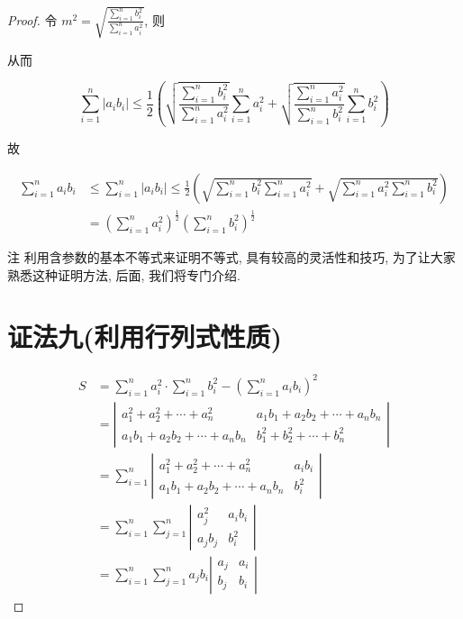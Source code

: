 \begin{proof}
	令 $m^{2}=\sqrt{\frac{\sum_{i=1}^{n} b_{i}^{2}}{\sum_{i=1}^{n} a_{i}^{2}}}$, 则
	
	
	从而
	
	$$
	\sum_{i=1}^{n}\left|a_{i} b_{i}\right| \leqslant \frac{1}{2}\left(\sqrt{\frac{\sum_{i=1}^{n} b_{i}^{2}}{\sum_{i=1}^{n} a_{i}^{2}}} \sum_{i=1}^{n} a_{i}^{2}+\sqrt{\frac{\sum_{i=1}^{n} a_{i}^{2}}{\sum_{i=1}^{n} b_{i}^{2}}} \sum_{i=1}^{n} b_{i}^{2}\right)
	$$
	
	故
	
	$$
	\begin{aligned}
	\sum_{i=1}^{n} a_{i} b_{i} & \leqslant \sum_{i=1}^{n}\left|a_{i} b_{i}\right| \leqslant \frac{1}{2}\left(\sqrt{\sum_{i=1}^{n} b_{i}^{2} \sum_{i=1}^{n} a_{i}^{2}}+\sqrt{\sum_{i=1}^{n} a_{i}^{2} \sum_{i=1}^{n} b_{i}^{2}}\right) \\
	& =\left(\sum_{i=1}^{n} a_{i}^{2}\right)^{\frac{1}{2}}\left(\sum_{i=1}^{n} b_{i}^{2}\right)^{\frac{1}{2}}
	\end{aligned}
	$$
	
	注 利用含参数的基本不等式来证明不等式, 具有较高的灵活性和技巧, 为了让大家熟悉这种证明方法, 后面, 我们将专门介绍.
	
	\section*{证法九(利用行列式性质)}
	$$
	\begin{aligned}
	S & =\sum_{i=1}^{n} a_{i}^{2} \cdot \sum_{i=1}^{n} b_{i}^{2}-\left(\sum_{i=1}^{n} a_{i} b_{i}\right)^{2} \\
	& =\left|\begin{array}{cc}
	a_{1}^{2}+a_{2}^{2}+\cdots+a_{n}^{2} & a_{1} b_{1}+a_{2} b_{2}+\cdots+a_{n} b_{n} \\
	a_{1} b_{1}+a_{2} b_{2}+\cdots+a_{n} b_{n} & b_{1}^{2}+b_{2}^{2}+\cdots+b_{n}^{2}
	\end{array}\right| \\
	& =\sum_{i=1}^{n}\left|\begin{array}{cc}
	a_{1}^{2}+a_{2}^{2}+\cdots+a_{n}^{2} & a_{i} b_{i} \\
	a_{1} b_{1}+a_{2} b_{2}+\cdots+a_{n} b_{n} & b_{i}^{2}
	\end{array}\right| \\
	& =\sum_{i=1}^{n} \sum_{j=1}^{n}\left|\begin{array}{cc}
	a_{j}^{2} & a_{i} b_{i} \\
	a_{j} b_{j} & b_{i}^{2}
	\end{array}\right| \\
	& =\sum_{i=1}^{n} \sum_{j=1}^{n} a_{j} b_{i}\left|\begin{array}{cc}
	a_{j} & a_{i} \\
	b_{j} & b_{i}
	\end{array}\right|
	\end{aligned}
	$$
	

\end{proof}
